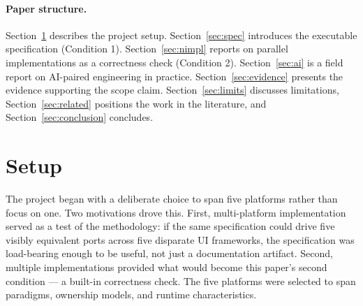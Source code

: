 \documentclass[10pt]{article}
\begin{document}
\paragraph{Paper structure.} Section~\ref{sec:setup} describes the project
setup. Section~\ref{sec:spec} introduces the executable specification
(Condition 1). Section~\ref{sec:nimpl} reports on parallel implementations
as a correctness check (Condition 2). Section~\ref{sec:ai} is a field
report on AI-paired engineering in practice. Section~\ref{sec:evidence}
presents the evidence supporting the scope claim. Section~\ref{sec:limits}
discusses limitations, Section~\ref{sec:related} positions the work in the
literature, and Section~\ref{sec:conclusion} concludes.

\section{Setup}
\label{sec:setup}

The project began with a deliberate choice to span five platforms rather
than focus on one. Two motivations drove this. First, multi-platform
implementation served as a test of the methodology: if the same
specification could drive five visibly equivalent ports across five
disparate UI frameworks, the specification was load-bearing enough to be
useful, not just a documentation artifact. Second, multiple implementations
provided what would become this paper's second condition --- a built-in
correctness check. The five platforms were selected to span paradigms,
ownership models, and runtime characteristics.
\end{document}
